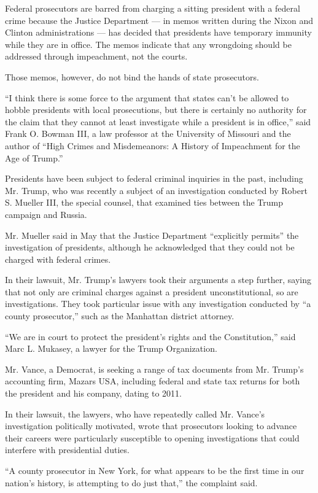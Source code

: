 Federal prosecutors are barred from charging a sitting president with a
federal crime because the Justice Department --- in memos written during
the Nixon and Clinton administrations --- has decided that presidents
have temporary immunity while they are in office. The memos indicate
that any wrongdoing should be addressed through impeachment, not the
courts.

Those memos, however, do not bind the hands of state prosecutors.

``I think there is some force to the argument that states can't be
allowed to hobble presidents with local prosecutions, but there is
certainly no authority for the claim that they cannot at least
investigate while a president is in office,'' said Frank O. Bowman III,
a law professor at the University of Missouri and the author of ``High
Crimes and Misdemeanors: A History of Impeachment for the Age of
Trump.''

Presidents have been subject to federal criminal inquiries in the past,
including Mr. Trump, who was recently a subject of an investigation
conducted by Robert S. Mueller III, the special counsel, that examined
ties between the Trump campaign and Russia.

Mr. Mueller said in May that the Justice Department ``explicitly
permits'' the investigation of presidents, although he acknowledged that
they could not be charged with federal crimes.

In their lawsuit, Mr. Trump's lawyers took their arguments a step
further, saying that not only are criminal charges against a president
unconstitutional, so are investigations. They took particular issue with
any investigation conducted by ``a county prosecutor,'' such as the
Manhattan district attorney.

``We are in court to protect the president's rights and the
Constitution,'' said Marc L. Mukasey, a lawyer for the Trump
Organization.

Mr. Vance, a Democrat, is seeking a range of tax documents from Mr.
Trump's accounting firm, Mazars USA, including federal and state tax
returns for both the president and his company, dating to 2011.

In their lawsuit, the lawyers, who have repeatedly called Mr. Vance's
investigation politically motivated, wrote that prosecutors looking to
advance their careers were particularly susceptible to opening
investigations that could interfere with presidential duties.

``A county prosecutor in New York, for what appears to be the first time
in our nation's history, is attempting to do just that,'' the complaint
said.

